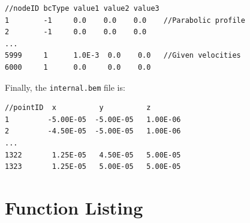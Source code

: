 \documentclass[12pt]{article}
\begin{document}
\small\begin{verbatim}
//nodeID bcType value1 value2 value3
1        -1     0.0    0.0    0.0    //Parabolic profile
2        -1     0.0    0.0    0.0
...
5999     1      1.0E-3  0.0    0.0   //Given velocities
6000     1      0.0     0.0    0.0
\end{verbatim}\normalsize

Finally, the \verb+internal.bem+ file is:

\small\begin{verbatim}
//pointID  x          y          z
1         -5.00E-05  -5.00E-05   1.00E-06
2         -4.50E-05  -5.00E-05   1.00E-06
...
1322       1.25E-05   4.50E-05   5.00E-05
1323       1.25E-05   5.00E-05   5.00E-05
\end{verbatim}\normalsize

\pagebreak

\appendix
\section{Function Listing}

\end{document}
